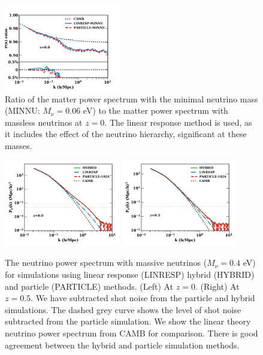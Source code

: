 \documentclass[useAMS, usenatbib]{mnras}
\begin{document}
\begin{figure}
\includegraphics[width=0.45\textwidth]{nuplots/pks_lowmass-10.pdf}
\caption{Ratio of the matter power spectrum with the minimal neutrino mass (MINNU: $M_\nu = 0.06$ eV) to the matter power spectrum with massless neutrinos at $z=0$. The linear response method is used, as it includes the effect of the neutrino hierarchy, significant at these masses.
}
\label{fig:minimal_mass}
\end{figure}

\begin{figure}
\includegraphics[width=0.45\textwidth]{nuplots/pks-nu-1.pdf}
\includegraphics[width=0.45\textwidth]{nuplots/pks-nu-0_6667.pdf}
  \caption{The neutrino power spectrum with massive neutrinos ($M_\nu = 0.4$ eV) for simulations using linear response (LINRESP) hybrid (HYBRID) and particle (PARTICLE) methods. (Left) At $z=0$. (Right) At $z=0.5$. We have subtracted shot noise from the particle and hybrid simulations. The dashed grey curve shows the level of shot noise subtracted from the particle simulation. We show the linear theory neutrino power spectrum from CAMB for comparison. There is good agreement between the hybrid and particle simulation methods.}
  \label{fig:neutrino_power}
\end{figure}
\end{document}
